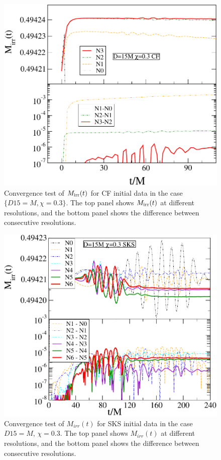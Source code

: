 \begin{figure}
 \includegraphics[scale=0.95]{chap5/CFMConvergence1}
  \caption[Convergence of $M_{\rm irr})(t)$ for CF initial
  data.]{Convergence test of $M_{\rm irr}(t)$ for CF initial data in the
  case $\{D15=M,\chi=0.3\}$. The top panel shows $M_{\rm irr}(t)$ at
  different resolutions, and the bottom panel shows the difference
  between consecutive resolutions.}
  \label{fig:CFMConvergence1}
\end{figure}

\begin{figure}[!htbp]
 \includegraphics[scale=0.95]{chap5/SKSMConvergence1}
  \caption[Convergence of $M_{\rm irr})(t)$ for SKS initial
  data.]{Convergence test of $M_{irr}(t)$ for SKS initial data in the
  case $D15=M$, $\chi=0.3$. The top panel shows $M_{irr}(t)$ at
  different resolutions, and the bottom panel shows the difference
  between consecutive resolutions.}

  \label{fig:SKSMConvergence1}
\end{figure}

